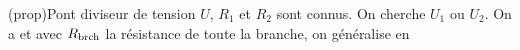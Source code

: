 \documentclass[../../main/main.tex]{subfiles}
\begin{document}
\begin{tcbraster}[raster columns=2, raster equal height=rows]
	\begin{tcb}[label=prop:divtens, sidebyside](prop){Pont diviseur de tension}
		$U$, $R_1$ et $R_2$ sont connus. On
		cherche $U_1$ ou $U_2$. On a
		\psw{
		\[
			\boxed{U_k = \frac{R_k}{R_1+R_2}U_{\rm brch}}
		\]
		}
		et avec $R_{\rm brch}$ la résistance de toute la branche, on généralise en
		\psw{
		\[
			\boxed{U_k = \frac{R_k}{R_{\rm brch}}U_{\rm brch}}
		\]
		}
		\tcblower
		\begin{center}
\end{center}
\end{tcb}
\end{tcbraster}
\end{document}
